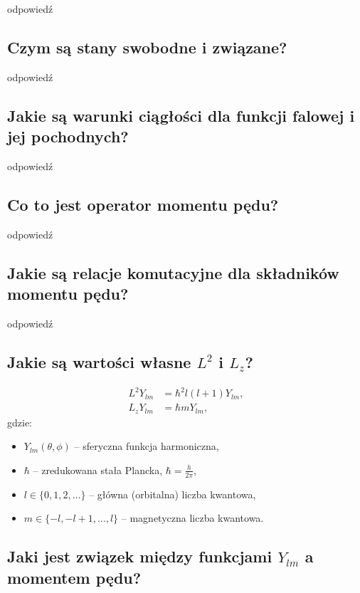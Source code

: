 odpowiedź

\subsection{Czym są stany swobodne i związane?}

odpowiedź

\subsection{Jakie są warunki ciągłości dla funkcji falowej i jej pochodnych?}

odpowiedź

\subsection{Co to jest operator momentu pędu?}

odpowiedź

\subsection{Jakie są relacje komutacyjne dla składników momentu pędu?}

odpowiedź

\subsection{Jakie są wartości własne $L^2$ i $L_z$?}

\begin{align*}
L^2 Y_{lm} &= \hbar^2 l(l+1) Y_{lm}, \\
L_z Y_{lm} &= \hbar m Y_{lm},
\end{align*}
gdzie:
\begin{itemize}
  \item \( Y_{lm}(\theta, \phi) \) -- sferyczna funkcja harmoniczna,
  \item \( \hbar \) -- zredukowana stała Plancka, \( \hbar = \frac{h}{2\pi} \),
  \item \( l \in \{0, 1, 2, \ldots\} \) -- główna (orbitalna) liczba kwantowa,
  \item \( m \in \{-l, -l+1, \ldots, l\} \) -- magnetyczna liczba kwantowa.
\end{itemize}

\subsection{Jaki jest związek między funkcjami $Y_{lm}$ a momentem pędu?}

